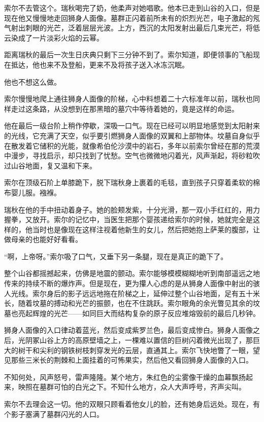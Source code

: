 \documentclass[AutoFakeBold=true]{book}
\begin{document}
索尔不去管这个。瑞秋喝完了奶，他柔声对她唱歌。他本已走到山谷的入口，但是现在他又慢慢地走回狮身人面像。墓群正闪着前所未有的炽烈光芒，电子激起的氖气射出刺眼的光芒，泛着层层光波。上方，西沉的太阳发射出最后几束光芒，将低云染成了一片淡彩火焰的云幂。

距离瑞秋的最后一次生日庆典只剩下三分钟不到了。索尔知道，即便领事的飞船现在抵达，他也来不及登船，更来不及将孩子送入冰冻沉眠。

他也不想这么做。

索尔慢慢地爬上通往狮身人面像的阶梯，心中料想着二十六标准年以前，瑞秋也同样走过这条路，从没想到在那黑暗的墓穴中等待着她的，竟是这样的命运。

他在最后一级台阶上稍作停歇，深吸一口气。现在已经可以明显地感觉到太阳射来的光线，它充满了天空，似乎要引燃狮身人面像的双翼和上部物体。坟墓自身似乎在散发着它储积的光能，就像希伯伦沙漠中的岩石，多年以前索尔曾经在那的荒漠中漫步，寻找启示，却只找到了忧愁。空气也微微地闪着光，风声渐起，将砂粒吹过山谷地面，复又温和下来。

索尔在顶级石阶上单膝跪下，脱下瑞秋身上裹着的毛毯，直到孩子只穿着柔软的棉布婴儿服。襁褓。

瑞秋在他的手中扭动着身子。她的脸颊发紫，十分光滑，那一双小手红红的，用力握拳，又放开。索尔的记忆中，当医生把那个婴孩递给索尔的时候，她就完全是这样的，他当时也是像现在这样注视着他新生的女儿，然后把她抱上萨莱的腹部，让做母亲的也能好好看看。

``啊，上帝呀。''索尔吸了口气，又垂下另一条腿，现在是真正的跪下了。

整个山谷都摇撼起来，仿佛是地震的颤动。索尔能够模模糊糊地听到南部遥远之地传来的持续不断的爆炸声。但是现在，更为攥人心虑的是从狮身人面像中射出的骇人光线。索尔身后的影子远远地拖在阶梯之上，延伸过整个山谷地面，足有五十米长，随着坟墓的搏动和光芒的振颤，也在不住跳跃。索尔眼角的余光瞥见其余的坟墓也亮起辉煌的光芒——如同巨大而结构复杂的原子反应堆熔毁前的最后几秒钟。

狮身人面像的入口律动着蓝光，然后变成紫罗兰色，最后变成惨白。狮身人面像之后，光阴冢山谷上方的高原壁墙之上，一棵难以置信的巨树闪着微光出现了，那巨大的树干和尖利的钢铁树枝刺穿发光的云层，直通其上。索尔飞快地瞥了一眼，望见那些三米长的荆棘和上面挂着的可怖果实，然后他又看回狮身人面像的入口。

不知何处，风声怒号，雷声隆隆。某个地方，朱红色的尘雾像干燥的血幕飘扬起来，映照在墓群可怕的白光之下。不知什么地方，众人大声呼号，齐声尖叫。

索尔不去理会这一切。他的双眼只顾看着他女儿的脸，还有她身后远处。现在，有个影子塞满了墓群闪光的人口。
\end{document}
